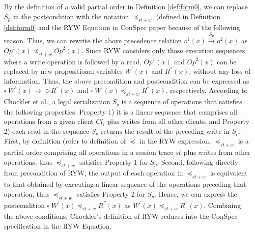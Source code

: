 \documentclass[journal,compsoc]{IEEEtran}
\begin{document}
  By the  definition of a valid partial order in Definition \ref{def:form0}, we can replace $S_p$ in the postcondition with the notation  $\preccurlyeq_{\mathit{st}+w}$ (defined in Definition \ref{def:form0} and the RYW Equation in ConSpec paper %
   because of the following reason.  Thus, we can rewrite the above precedence relation  $ \mathit{o}^1(x) \xrightarrow{S_p} \mathit{o}^2(x) $ as $\mathit{Op}^1(x) \preccurlyeq_{\mathit{st}+w} \mathit{Op}^2(x)$. Since RYW considers only those execution sequences where a write operation is followed by a read, $\mathit{Op}^1(x)$ and $\mathit{Op}^2(x)$ can be  replaced  by new propositional variables
   $W^{'}(x)$ and $R^{''}(x)$, without any loss of information. Thus, the above precondition and postcondition can be expressed as  $ \square\; W^{'}(x) \rightarrow \lozenge R^{''}(x)$ and $ \square\; W^{'}(x) \preccurlyeq_{\mathit{st}+w}  R^{''}(x) $, respectively.
    According to Chockler et al., a legal serialization $S_p$ is a sequence of operations that satisfies the following properties: Property 1) it is a linear sequence that comprises all operations from a given client $\mathit{Cl}_i$ plus writes from all other clients, and Property 2) each read in the sequence $S_p$ returns the result of the preceding write in $S_p$.  First, by definition (refer to definition of $\preccurlyeq$ in the RYW expression, $\preccurlyeq_{\mathit{st}+w}$ is a partial order  comprising all operations in a session trace $\mathit{st}$ plus writes from other operations, thus $\preccurlyeq_{\mathit{st}+w}$ satisfies Property 1 for $S_p$. Second, following directly from precondition of RYW, the output of each operation in $\preccurlyeq_{\mathit{st}+w}$ is equivalent to that obtained by executing a linear sequence of the operations preceding that operation, thus $\preccurlyeq_{\mathit{st}+w}$ satisfies Property 2 for $S_p$. Hence, we can express the postcondition
    $ \square\; W^{'}(x) \preccurlyeq_{\mathit{st}+w} R^{''}(x) $ as  $W^{'}(x) \preccurlyeq_{\mathit{st}+w} R^{''}(x)$. Combining the above conditions, Chockler's definition of RYW reduces into the ConSpec specification in the RYW Equation. %
\end{document}

